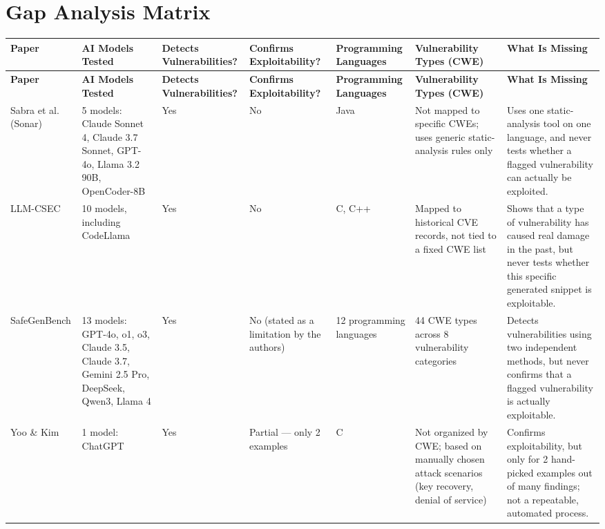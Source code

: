 \documentclass[10pt]{article}
\begin{document}
\begin{landscape}
\begin{longtable}{
  P{2.6cm}
  P{3.6cm}
  P{3.2cm}
  P{4.0cm}
  P{3.0cm}
  P{3.0cm}
  P{2.2cm}
  P{3.6cm}
}
\end{longtable}

\clearpage
\section*{Gap Analysis Matrix}

\normalsize
\vspace{6pt}
\footnotesize
\begin{longtable}{
  P{2.4cm}
  P{3.4cm}
  P{1.6cm}
  P{1.8cm}
  P{2.2cm}
  P{3.6cm}
  P{5.2cm}
}
\toprule
\textbf{Paper} & \textbf{AI Models Tested} & \textbf{Detects Vulnerabilities?} & \textbf{Confirms Exploitability?} & \textbf{Programming Languages} & \textbf{Vulnerability Types (CWE)} & \textbf{What Is Missing} \\
\midrule
\endfirsthead
\toprule
\textbf{Paper} & \textbf{AI Models Tested} & \textbf{Detects Vulnerabilities?} & \textbf{Confirms Exploitability?} & \textbf{Programming Languages} & \textbf{Vulnerability Types (CWE)} & \textbf{What Is Missing} \\
\midrule
\endhead
\bottomrule
\endfoot
\bottomrule
\endlastfoot

Sabra et al. (Sonar)
&
5 models: Claude Sonnet 4, Claude 3.7 Sonnet, GPT-4o, Llama 3.2 90B, OpenCoder-8B
&
Yes
&
No
&
Java
&
Not mapped to specific CWEs; uses generic static-analysis rules only
&
Uses one static-analysis tool on one language, and never tests whether a flagged vulnerability can actually be exploited.
\\[4pt]

LLM-CSEC
&
10 models, including CodeLlama
&
Yes
&
No
&
C, C++
&
Mapped to historical CVE records, not tied to a fixed CWE list
&
Shows that a type of vulnerability has caused real damage in the past, but never tests whether this specific generated snippet is exploitable.
\\[4pt]

SafeGenBench
&
13 models: GPT-4o, o1, o3, Claude 3.5, Claude 3.7, Gemini 2.5 Pro, DeepSeek, Qwen3, Llama 4
&
Yes
&
No (stated as a limitation by the authors)
&
12 programming languages
&
44 CWE types across 8 vulnerability categories
&
Detects vulnerabilities using two independent methods, but never confirms that a flagged vulnerability is actually exploitable.
\\[4pt]

Yoo \& Kim
&
1 model: ChatGPT
&
Yes
&
Partial --- only 2 examples
&
C
&
Not organized by CWE; based on manually chosen attack scenarios (key recovery, denial of service)
&
Confirms exploitability, but only for 2 hand-picked examples out of many findings; not a repeatable, automated process.
\\[4pt]


\end{longtable}
\end{landscape}
\end{document}
